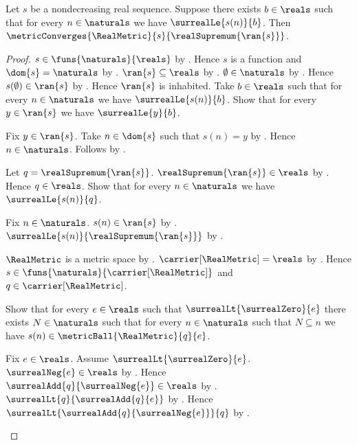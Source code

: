 \begin{theorem}\label{nondecreasing_real_sequence_converges_to_supremum}
    Let $s$ be a nondecreasing real sequence.
    Suppose there exists $b\in\reals$ such that for every
        $n\in\naturals$ we have $\surrealLe{s(n)}{b}$.
    Then $\metricConverges{\RealMetric}{s}{\realSupremum{\ran{s}}}$.
\end{theorem}
\begin{proof}
    $s\in\funs{\naturals}{\reals}$ by
        .
    Hence $s$ is a function and $\dom{s}=\naturals$ by
        .
    $\ran{s}\subseteq\reals$ by .
    $\emptyset\in\naturals$ by .
    Hence $s(\emptyset)\in\ran{s}$ by .
    Hence $\ran{s}$ is inhabited.
    Take $b\in\reals$ such that for every $n\in\naturals$ we have
        $\surrealLe{s(n)}{b}$.
    Show that for every $y\in\ran{s}$ we have $\surrealLe{y}{b}$.
    \begin{subproof}
        Fix $y\in\ran{s}$.
        Take $n\in\dom{s}$ such that $s(n)=y$ by .
        Hence $n\in\naturals$.
        Follows by \auto.
    \end{subproof}

    Let $q=\realSupremum{\ran{s}}$.
    $\realSupremum{\ran{s}}\in\reals$ by
        .
    Hence $q\in\reals$.
    Show that for every $n\in\naturals$ we have
        $\surrealLe{s(n)}{q}$.
    \begin{subproof}
        Fix $n\in\naturals$.
        $s(n)\in\ran{s}$ by .
        $\surrealLe{s(n)}{\realSupremum{\ran{s}}}$ by
            .
    \end{subproof}

    $\RealMetric$ is a metric space by .
    $\carrier[\RealMetric]=\reals$ by
        .
    Hence $s\in\funs{\naturals}{\carrier[\RealMetric]}$ and
        $q\in\carrier[\RealMetric]$.

    Show that for every $e\in\reals$ such that
        $\surrealLt{\surrealZero}{e}$ there exists $N\in\naturals$
        such that for every $n\in\naturals$ such that $N\subseteq n$
        we have $s(n)\in\metricBall{\RealMetric}{q}{e}$.
    \begin{subproof}
        Fix $e\in\reals$.
        Assume $\surrealLt{\surrealZero}{e}$.
        $\surrealNeg{e}\in\reals$ by
            .
        Hence $\surrealAdd{q}{\surrealNeg{e}}\in\reals$ by
            .
        $\surrealLt{q}{\surrealAdd{q}{e}}$ by
            .
        Hence $\surrealLt{\surrealAdd{q}{\surrealNeg{e}}}{q}$ by
            .


\end{subproof}
\end{proof}

